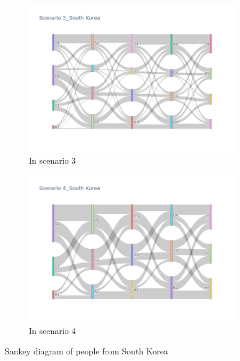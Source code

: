 \begin{figure}[h]
\begin{subfigure}{0.5\textwidth}
    \includegraphics[width=\linewidth]{Figure/figure33c.png}
    \caption{In scenario 3}
    \label{fig33c}
  \end{subfigure}
  \begin{subfigure}{0.5\textwidth}
    \centering
    \includegraphics[width=\linewidth]{Figure/figure33d.png}
    \caption{In scenario 4}
    \label{fig33d}
  \end{subfigure}
  \caption{ Sankey diagram of people from South Korea }
  \label{fig33}
\end{figure}

